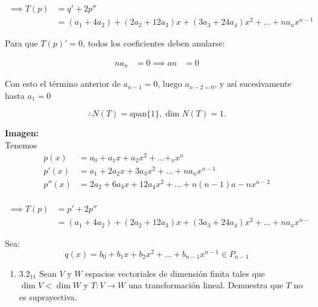 \documentclass{article}
\begin{document}
\begin{enumerate}
			\begin{equation*}
				\begin{aligned}
					\implies T(p) &= q' + 2p'' \\
								  &= (a_1 + 4a_2) + (2a_2+12a_3)x + (3a_3+24a_4)x^2 + \dots + n a_n x^{n-1}
				\end{aligned}
			\end{equation*}
			
			Para que \(T(p)'=0\), todos los coeficientes deben anularse:
			
			\begin{equation*}
				\begin{aligned}
					na_n &= 0
					\implies an &=0
				\end{aligned}
			\end{equation*}
			
			Con esto el término anterior de \(a_{n-1}=0\), luego \(a_{n-2=0}\), y así sucesivamente hasta \(a_1=0\)
			
			\[
			\boxed{\therefore N(T)= \text{span}\{1\}, \dim N(T)=1.}
			\]
			
			\textbf{Imagen: }\\
			Tenemos
			\begin{equation*}
				\begin{aligned}
					p(x) &= a_0+a_1x+a_2x^2+\dots +_nx^{n} \\
					p'(x)  &= a_1+2a_2x+3a_3x^2+ \dots +na_{n}x^{n-1} \\
					p''(x) &= 2a_2+6a_3x+12a_4x^2+ \dots +n(n-1)a-{n}x^{n-2} \\
				\end{aligned}
			\end{equation*}
			
			\begin{equation*}
				\begin{aligned}
					\implies T(p) &=p'+2p'' \\
								  &=(a_1+4a_2)+(2a_2+12a_3)x+(3a_3+24a_4)x^2+\dots +na_{n}x^{n-}
				\end{aligned}
			\end{equation*}
			
			Sea:
			\begin{equation*}
				q(x)=b_0+b_1x+b_2x^2+\dots +b_{n-1}x^{n-1} \in P_{n-1}
			\end{equation*}
			
		\end{enumerate}
		
		\begin{enumerate}
			
			
			\item[] \(3.2_{11}\) Sean \(V\) y \(W\) espacios vectoriales de dimensión finita tales que \(\dim V<\dim W\) y \(T:V\to W\) una transformación lineal. Demuestra que \(T\) no es suprayectiva.
			
		\end{enumerate}
		
\end{document}
